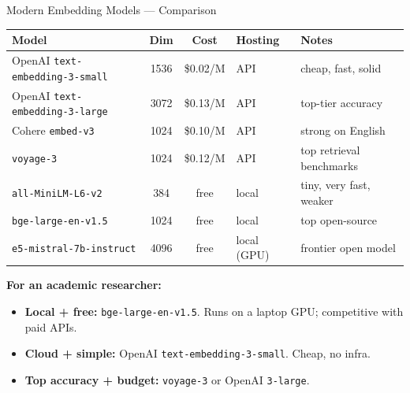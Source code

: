 \documentclass[10pt,english,aspectratio=169]{beamer}
\begin{document}
\begin{frame}{Modern Embedding Models --- Comparison}
\begin{center}
\renewcommand{\arraystretch}{1.25}
\small
\begin{tabular}{|l|c|c|l|l|}
\hline
\textbf{Model} & \textbf{Dim} & \textbf{Cost} & \textbf{Hosting} & \textbf{Notes} \\
\hline
OpenAI \texttt{text-embedding-3-small} & 1536 & \$0.02/M & API & cheap, fast, solid \\
\hline
OpenAI \texttt{text-embedding-3-large} & 3072 & \$0.13/M & API & top-tier accuracy \\
\hline
Cohere \texttt{embed-v3} & 1024 & \$0.10/M & API & strong on English \\
\hline
\texttt{voyage-3} & 1024 & \$0.12/M & API & top retrieval benchmarks \\
\hline
\texttt{all-MiniLM-L6-v2} & 384 & free & local & tiny, very fast, weaker \\
\hline
\texttt{bge-large-en-v1.5} & 1024 & free & local & top open-source \\
\hline
\texttt{e5-mistral-7b-instruct} & 4096 & free & local (GPU) & frontier open model \\
\hline
\end{tabular}
\end{center}

\bigskip
\textbf{For an academic researcher:}
\begin{itemize}
\item \textbf{Local + free:} \texttt{bge-large-en-v1.5}. Runs on a laptop GPU; competitive with paid APIs.
\item \textbf{Cloud + simple:} OpenAI \texttt{text-embedding-3-small}. Cheap, no infra.
\item \textbf{Top accuracy + budget:} \texttt{voyage-3} or OpenAI \texttt{3-large}.
\end{itemize}
\end{frame}
\end{document}
